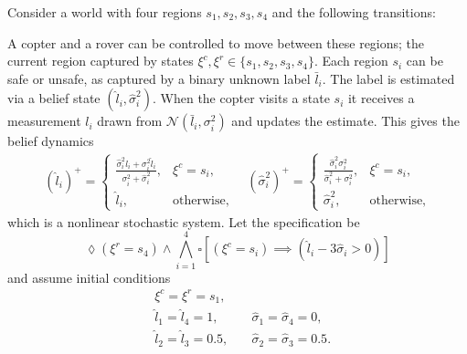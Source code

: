 \documentclass[conference]{IEEEtran}
\begin{document}
Consider a world with four regions $s_1, s_2, s_3, s_4$ and the following transitions:

\begin{center}
\end{center}

A copter and a rover can be controlled to move between these regions; the current region captured by states $\xi^c, \xi^r \in \{ s_1, s_2, s_3, s_4 \}$. Each region $s_i$ can be safe or unsafe, as captured by a binary unknown label $\bar l_i$. The label is estimated via a belief state $(\hat l_i, \hat \sigma^2_i)$. When the copter visits a state $s_i$ it receives a measurement $l_i$ drawn from $\mathcal N(\bar l_i, \sigma_i^2)$ and updates the estimate. This gives the belief dynamics
\begin{equation}
\begin{aligned}
(\hat l_i)^+ =
\begin{cases}
  \frac{\hat \sigma^2_i l_i + \sigma_i^2 \hat l_i}{\sigma_i^2 + \hat \sigma_i^2}, & \xi^c = s_i, \\
  \hat l_i, & \text{otherwise,}
\end{cases}
\quad (\hat \sigma_i^2)^+ = 
\begin{cases}
  \frac{\hat \sigma_i^2 \sigma_i^2}{\hat \sigma_i^2 + \sigma_i^2}, & \xi^c = s_i, \\
  \hat \sigma_i^2, & \text{otherwise,}
\end{cases}
\end{aligned}
\end{equation}
which is a nonlinear stochastic system. Let the specification be
\begin{equation}
  \lozenge (\xi^r = s_4) \land \bigwedge_{i=1}^4 \square \left[ (\xi^c = s_i) \implies (\hat l_i -3 \hat\sigma_i > 0) \right]
\end{equation}
and assume initial conditions
\begin{equation}
\begin{aligned}
  & \xi^c = \xi^r = s_1, & \\
  & \hat l_1 = \hat l_4 = 1, \quad   & \hat \sigma_1 = \hat \sigma_4 = 0, \\
  & \hat l_2 = \hat l_3 = 0.5, \quad & \hat \sigma_2 = \hat \sigma_3 = 0.5.
\end{aligned}
\end{equation}
\end{document}
